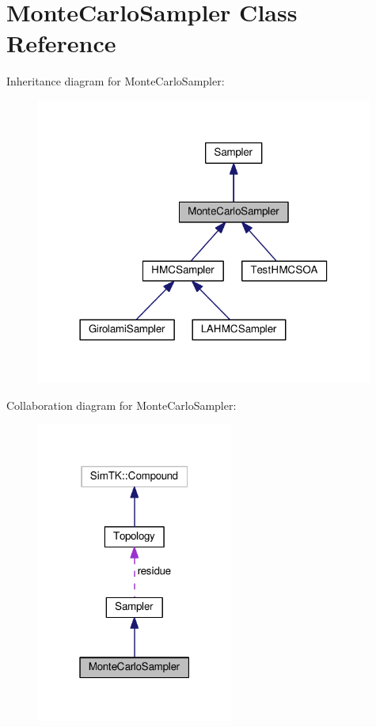 \hypertarget{classMonteCarloSampler}{}\section{Monte\+Carlo\+Sampler Class Reference}
\label{classMonteCarloSampler}


Inheritance diagram for Monte\+Carlo\+Sampler\+:\nopagebreak
\begin{figure}[H]
\begin{center}
\leavevmode
\includegraphics[width=314pt]{classMonteCarloSampler__inherit__graph}
\end{center}
\end{figure}


Collaboration diagram for Monte\+Carlo\+Sampler\+:\nopagebreak
\begin{figure}[H]
\begin{center}
\leavevmode
\includegraphics[width=183pt]{classMonteCarloSampler__coll__graph}
\end{center}
\end{figure}
